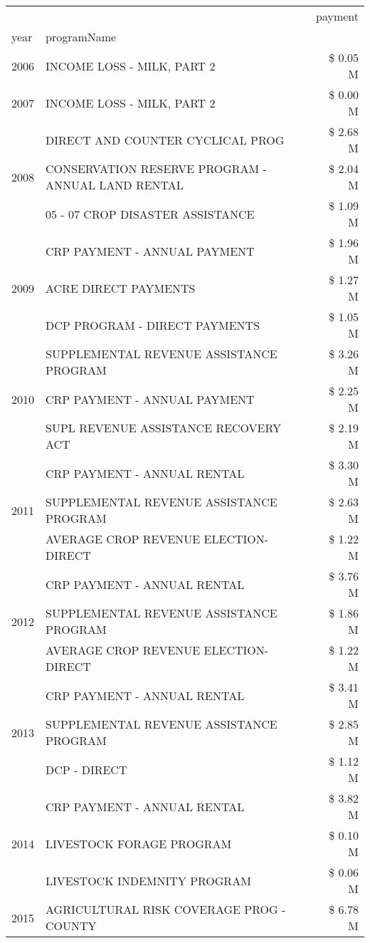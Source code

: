 \begin{tabular}{llr}
\toprule
 &  & payment \\
year & programName &  \\
\midrule
2006 & INCOME LOSS - MILK, PART 2 & \$ 0.05 M \\
\cline{1-3}
2007 & INCOME LOSS - MILK, PART 2 & \$ 0.00 M \\
\cline{1-3}
\multirow[t]{3}{*}{2008} & DIRECT AND COUNTER CYCLICAL PROG & \$ 2.68 M \\
 & CONSERVATION RESERVE PROGRAM - ANNUAL LAND RENTAL & \$ 2.04 M \\
 & 05 - 07 CROP DISASTER ASSISTANCE & \$ 1.09 M \\
\cline{1-3}
\multirow[t]{3}{*}{2009} & CRP PAYMENT - ANNUAL PAYMENT & \$ 1.96 M \\
 & ACRE DIRECT PAYMENTS & \$ 1.27 M \\
 & DCP PROGRAM - DIRECT PAYMENTS & \$ 1.05 M \\
\cline{1-3}
\multirow[t]{3}{*}{2010} & SUPPLEMENTAL REVENUE ASSISTANCE PROGRAM & \$ 3.26 M \\
 & CRP PAYMENT - ANNUAL PAYMENT & \$ 2.25 M \\
 & SUPL REVENUE ASSISTANCE RECOVERY ACT & \$ 2.19 M \\
\cline{1-3}
\multirow[t]{3}{*}{2011} & CRP PAYMENT - ANNUAL RENTAL & \$ 3.30 M \\
 & SUPPLEMENTAL REVENUE ASSISTANCE PROGRAM & \$ 2.63 M \\
 & AVERAGE CROP REVENUE ELECTION-DIRECT & \$ 1.22 M \\
\cline{1-3}
\multirow[t]{3}{*}{2012} & CRP PAYMENT - ANNUAL RENTAL & \$ 3.76 M \\
 & SUPPLEMENTAL REVENUE ASSISTANCE PROGRAM & \$ 1.86 M \\
 & AVERAGE CROP REVENUE ELECTION-DIRECT & \$ 1.22 M \\
\cline{1-3}
\multirow[t]{3}{*}{2013} & CRP PAYMENT - ANNUAL RENTAL & \$ 3.41 M \\
 & SUPPLEMENTAL REVENUE ASSISTANCE PROGRAM & \$ 2.85 M \\
 & DCP - DIRECT & \$ 1.12 M \\
\cline{1-3}
\multirow[t]{3}{*}{2014} & CRP PAYMENT - ANNUAL RENTAL & \$ 3.82 M \\
 & LIVESTOCK FORAGE PROGRAM & \$ 0.10 M \\
 & LIVESTOCK INDEMNITY PROGRAM & \$ 0.06 M \\
\cline{1-3}
\multirow[t]{3}{*}{2015} & AGRICULTURAL RISK COVERAGE PROG - COUNTY & \$ 6.78 M \\

\end{tabular}
